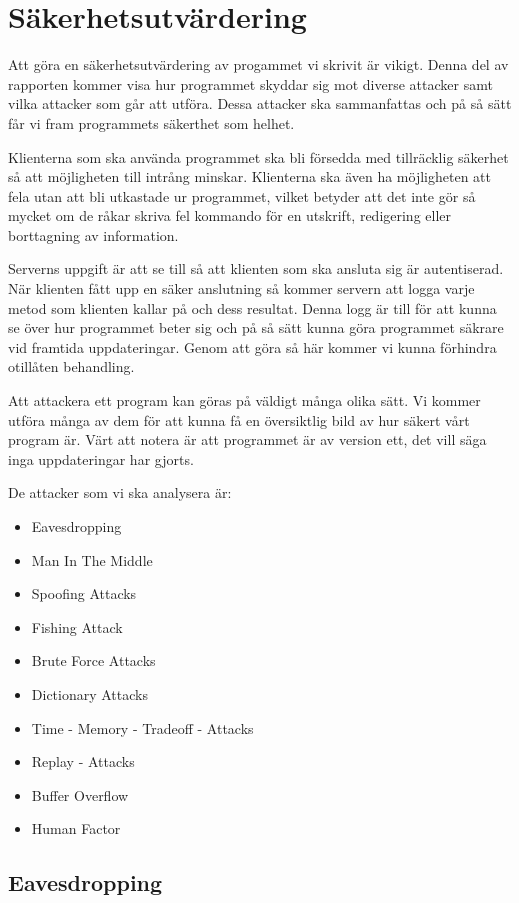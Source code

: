 \section{Säkerhetsutvärdering}
Att göra en säkerhetsutvärdering av progammet vi skrivit är vikigt. Denna del av rapporten kommer visa hur programmet skyddar sig mot diverse attacker samt vilka attacker som går att utföra. Dessa attacker ska sammanfattas och på så sätt får vi fram programmets säkerthet som helhet. 

Klienterna som ska använda programmet ska bli försedda med tillräcklig säkerhet så att möjligheten till intrång minskar. Klienterna ska även ha möjligheten att fela utan att bli utkastade ur programmet, vilket betyder att det inte gör så mycket om de råkar skriva fel kommando för en utskrift, redigering eller borttagning av information.

Serverns uppgift är att se till så att klienten som ska ansluta sig är autentiserad. När klienten fått upp en säker anslutning så kommer servern att logga varje metod som klienten kallar på och dess resultat. Denna logg är till för att kunna se över hur programmet beter sig och på så sätt kunna göra programmet säkrare vid framtida uppdateringar. Genom att göra så här kommer vi kunna förhindra otillåten behandling.

Att attackera ett program kan göras på väldigt många olika sätt. Vi kommer utföra många av dem för att kunna få en översiktlig bild av hur säkert vårt program är. Värt att notera är att programmet är av version ett, det vill säga inga uppdateringar har gjorts. 

De attacker som vi ska analysera är:

\begin{itemize}
\item{Eavesdropping}
\item{Man In The Middle}
\item{Spoofing Attacks}
\item{Fishing Attack}
\item{Brute Force Attacks}
\item{Dictionary Attacks}
\item{Time - Memory - Tradeoff - Attacks}
\item{Replay - Attacks}
\item{Buffer Overflow}
\item{Human Factor}
\end{itemize}

\subsection{Eavesdropping}
